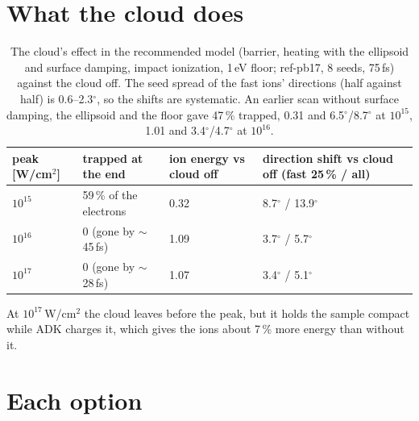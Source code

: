 \section{What the cloud does}

\begin{table}[H]
\centering\small
\begin{tabularx}{\textwidth}{@{}l X X X@{}}
\toprule
peak [W/cm$^2$] & trapped at the end & ion energy vs cloud off & direction shift vs cloud off (fast 25\,\% / all) \\
\midrule
$10^{15}$ & 59\,\% of the electrons & 0.32 & 8.7$^\circ$ / 13.9$^\circ$ \\
$10^{16}$ & 0 (gone by $\sim$45\,fs) & 1.09 & 3.7$^\circ$ / 5.7$^\circ$ \\
$10^{17}$ & 0 (gone by $\sim$28\,fs) & 1.07 & 3.4$^\circ$ / 5.1$^\circ$ \\
\bottomrule
\end{tabularx}
\caption{The cloud's effect in the recommended model (barrier, heating with the ellipsoid and surface damping, impact
ionization, 1\,eV floor; ref-pb17, 8 seeds, 75\,fs) against the cloud off. The seed spread of the fast ions' directions
(half against half) is 0.6--2.3$^\circ$, so the shifts are systematic. An earlier scan without surface damping, the
ellipsoid and the floor gave 47\,\% trapped, 0.31 and 6.5$^\circ$/8.7$^\circ$ at $10^{15}$, 1.01 and 3.4$^\circ$/4.7$^\circ$
at $10^{16}$.}
\end{table}
At $10^{17}$\,W/cm$^2$ the cloud leaves before the peak, but it holds the sample compact while ADK charges it, which gives
the ions about 7\,\% more energy than without it.

\section{Each option}

